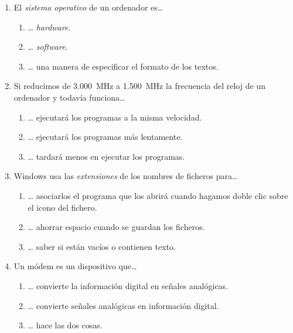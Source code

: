 \begin{enumerate}
\item El \emph{sistema operativo} de un ordenador es{\ldots} \begin{enumerate} \item {\ldots} \emph{hardware}. \item {\ldots} \emph{software}. \item {\ldots} una manera de especificar el formato de los textos. \end{enumerate} 

\item Si reducimos de 3.000~MHz a 1.500~MHz la frecuencia del reloj de un ordenador y todavía funciona{\ldots} \begin{enumerate} \item {\ldots} ejecutará los programas a la misma velocidad. \item {\ldots} ejecutará los programas más lentamente. \item {\ldots} tardará menos en ejecutar los programas. \end{enumerate} 

\item Windows usa las \emph{extensiones} de los nombres de ficheros para{\ldots} \begin{enumerate} \item {\ldots} asociarlos el programa que los abrirá cuando hagamos doble clic sobre el icono del fichero. \item {\ldots} ahorrar espacio cuando se guardan los ficheros. \item {\ldots} saber si están vacíos o contienen texto. \end{enumerate} 

\item Un módem es un dispositivo que{\ldots} \begin{enumerate} \item {\ldots} convierte la información digital en señales analógicas. \item {\ldots} convierte señales analógicas en información digital. \item {\ldots} hace las dos cosas. \end{enumerate} 


\end{enumerate}
